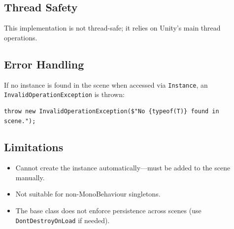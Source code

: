 \subsection{Thread Safety}
This implementation is not thread-safe; it relies on Unity’s main thread operations.

\subsection{Error Handling}
If no instance is found in the scene when accessed via \texttt{Instance}, an \texttt{InvalidOperationException} is thrown:
\begin{verbatim}
throw new InvalidOperationException($"No {typeof(T)} found in scene.");
\end{verbatim}

\subsection{Limitations}
\begin{itemize}
    \item Cannot create the instance automatically—must be added to the scene manually.
    \item Not suitable for non-MonoBehaviour singletons.
    \item The base class does not enforce persistence across scenes (use \texttt{DontDestroyOnLoad} if needed).
\end{itemize}
